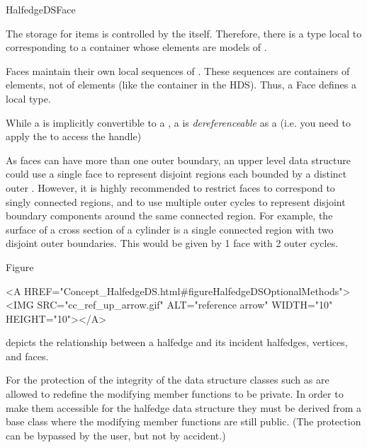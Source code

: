 \begin{ccRefConcept}{HalfedgeDSFace}
\begin{ccAdvanced}
{\XHDS
The storage for  items is controlled by the  itself. Therefore, 
there is a  type local to  corresponding to a 
container whose elements are models of .

Faces maintain their own local sequences of . These sequences are
containers of  elements, not of  elements (like the
container in the HDS). Thus, a Face defines a local  type.

While a  is implicitly convertible to a ,
a  is {\em dereferenceable} as a  
(i.e. you need to apply the  to access the handle)
}
\end{ccAdvanced}

\begin{ccAdvanced}
{\XHDS
As faces can have more than one outer boundary, an upper level data structure could use a single
face to represent disjoint regions each bounded by a distinct outer . However,
it is highly recommended to restrict faces to correspond to singly connected regions, and
to use multiple outer cycles to represent disjoint boundary components around the same 
connected region. For example, the surface of a cross section of a cylinder is a single
connected region with two disjoint outer boundaries. This would be given by 1 face with
2 outer cycles.
}
\end{ccAdvanced}

Figure~\begin{ccHtmlOnly}
  <A HREF="Concept_HalfedgeDS.html#figureHalfedgeDSOptionalMethods"><IMG 
  SRC="cc_ref_up_arrow.gif" ALT="reference arrow" WIDTH="10" HEIGHT="10"></A>
\end{ccHtmlOnly}
depicts the relationship between a halfedge and its incident
halfedges, vertices, and faces.

For the protection of the integrity of the data structure classes such as
 are allowed to redefine the modifying member 
functions to be private. In order to make them accessible for the 
halfedge data structure they must be derived from a base class 
where the modifying member functions are still public. (The protection
can be bypassed by the user, but not by accident.)


\end{ccRefConcept}
